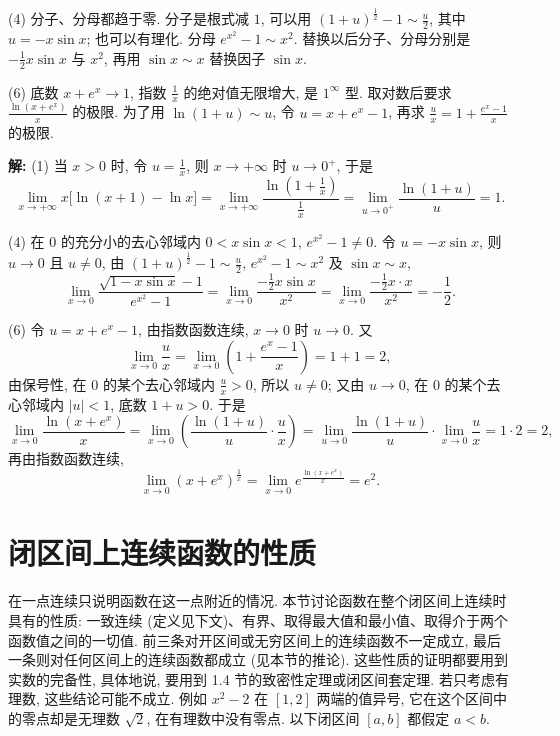 \documentclass[UTF8,openany]{ctexbook}
\theoremstyle{chinesetextbook}
\newenvironment{cnsolution}{\par\indent\textbf{解:} \ignorespaces}{\par}
\begin{document}
(4) 分子、分母都趋于零. 分子是根式减 $1$, 可以用 $\displaystyle(1+u)^{\frac12}-1\sim\frac u2$, 其中 $u=-x\sin x$; 也可以有理化. 分母 $e^{x^2}-1\sim x^2$. 替换以后分子、分母分别是 $\displaystyle-\frac12x\sin x$ 与 $x^2$, 再用 $\sin x\sim x$ 替换因子 $\sin x$.

(6) 底数 $x+e^x\to1$, 指数 $\displaystyle\frac1x$ 的绝对值无限增大, 是 $1^\infty$ 型. 取对数后要求 $\displaystyle\frac{\ln(x+e^x)}x$ 的极限. 为了用 $\ln(1+u)\sim u$, 令 $u=x+e^x-1$, 再求 $\displaystyle\frac ux=1+\frac{e^x-1}x$ 的极限.
\begin{cnsolution}
(1) 当 $x>0$ 时, 令 $\displaystyle u=\frac1x$, 则 $x\to+\infty$ 时 $u\to0^+$, 于是
\[
\lim_{x\to+\infty}x\bigl[\ln(x+1)-\ln x\bigr]=\lim_{x\to+\infty}\frac{\ln\left(1+\frac1x\right)}{\frac1x}=\lim_{u\to0^+}\frac{\ln(1+u)}u=1.
\]

(4) 在 $0$ 的充分小的去心邻域内 $0<x\sin x<1$, $e^{x^2}-1\ne0$. 令 $u=-x\sin x$, 则 $u\to0$ 且 $u\ne0$, 由 $\displaystyle(1+u)^{\frac12}-1\sim\frac u2$, $e^{x^2}-1\sim x^2$ 及 $\sin x\sim x$,
\[
\lim_{x\to0}\frac{\sqrt{1-x\sin x}-1}{e^{x^2}-1}=\lim_{x\to0}\frac{-\frac12x\sin x}{x^2}=\lim_{x\to0}\frac{-\frac12x\cdot x}{x^2}=-\frac12.
\]

(6) 令 $u=x+e^x-1$, 由指数函数连续, $x\to0$ 时 $u\to0$. 又
\[
\lim_{x\to0}\frac ux=\lim_{x\to0}\left(1+\frac{e^x-1}x\right)=1+1=2,
\]
由保号性, 在 $0$ 的某个去心邻域内 $\displaystyle\frac ux>0$, 所以 $u\ne0$; 又由 $u\to0$, 在 $0$ 的某个去心邻域内 $|u|<1$, 底数 $1+u>0$. 于是
\[
\lim_{x\to0}\frac{\ln(x+e^x)}x=\lim_{x\to0}\left(\frac{\ln(1+u)}u\cdot\frac ux\right)=\lim_{u\to0}\frac{\ln(1+u)}u\cdot\lim_{x\to0}\frac ux=1\cdot2=2,
\]
再由指数函数连续,
\[
\lim_{x\to0}\left(x+e^x\right)^{\frac1x}=\lim_{x\to0}e^{\frac{\ln(x+e^x)}x}=e^2.
\]
\end{cnsolution}
\section{闭区间上连续函数的性质}
在一点连续只说明函数在这一点附近的情况. 本节讨论函数在整个闭区间上连续时具有的性质: 一致连续 (定义见下文)、有界、取得最大值和最小值、取得介于两个函数值之间的一切值. 前三条对开区间或无穷区间上的连续函数不一定成立, 最后一条则对任何区间上的连续函数都成立 (见本节的推论). 这些性质的证明都要用到实数的完备性, 具体地说, 要用到 1.4 节的致密性定理或闭区间套定理. 若只考虑有理数, 这些结论可能不成立. 例如 $x^2-2$ 在 $[1,2]$ 两端的值异号, 它在这个区间中的零点却是无理数 $\sqrt2$, 在有理数中没有零点. 以下闭区间 $[a,b]$ 都假定 $a<b$.
\end{document}
